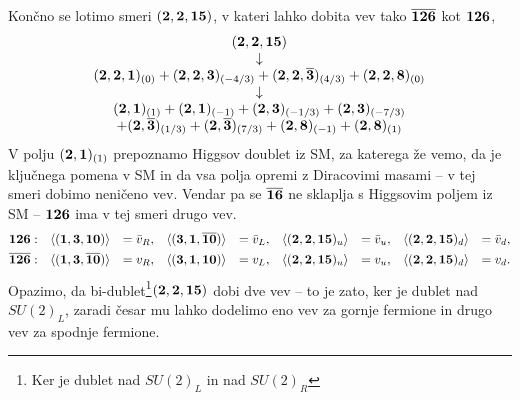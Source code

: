 Končno se lotimo smeri $(\mathbf{2}, \mathbf{2}, \mathbf{15})$, v kateri lahko dobita vev tako $\overline{\mathbf{126}}$ kot $\mathbf{126}$,
\begin{align}
	\begin{array}{c}
		(\mathbf{2}, \mathbf{2}, \mathbf{15}) \\
		\downarrow \\
		(\mathbf{2}, \mathbf{2}, \mathbf{1})_{(0)} + (\mathbf{2}, \mathbf{2}, \mathbf{3})_{(-4/3)} + (\mathbf{2}, \mathbf{2}, \overline{\mathbf{3}})_{(4/3)}
			+ (\mathbf{2}, \mathbf{2}, \mathbf{8})_{(0)} \\
		\downarrow \\
		(\mathbf{2}, \mathbf{1})_{(1)} + (\mathbf{2}, \mathbf{1})_{(-1)} + (\mathbf{2}, \mathbf{3})_{(-1/3)} + (\mathbf{2}, \mathbf{3})_{(-7/3)} \\
		+ (\mathbf{2}, \overline{\mathbf{3}})_{(1/3)} + (\mathbf{2}, \overline{\mathbf{3}})_{(7/3)} + (\mathbf{2}, \mathbf{8})_{(-1)} + (\mathbf{2}, \mathbf{8})_{(1)}
	\end{array}
\end{align}
V polju $(\mathbf{2}, \mathbf{1})_{(1)}$ prepoznamo Higgsov doublet iz SM, za katerega že vemo, da je ključnega pomena
v SM in da vsa polja opremi z Diracovimi masami -- v tej smeri dobimo neničeno vev. Vendar pa se
$\overline{\mathbf{16}}$ ne sklaplja s Higgsovim poljem iz SM -- $\mathbf{126}$ ima v tej smeri drugo vev.
\begin{alignat}{7}
	\mathbf{126}:&\quad \langle(\mathbf{1}, \mathbf{3}, \mathbf{10})\rangle &= \bar{v}_R, &\quad \langle(\mathbf{3}, \mathbf{1}, \overline{\mathbf{10}})\rangle
		&=\bar{v}_L, &\quad \langle(\mathbf{2}, \mathbf{2}, \mathbf{15})_u\rangle &= \bar{v}_u, &\quad
		\langle(\mathbf{2}, \mathbf{2}, \mathbf{15})_d\rangle &= \bar{v}_d, \notag \\
	\overline{\mathbf{126}}:&\quad \langle(\mathbf{1}, \mathbf{3}, \overline{\mathbf{10}})\rangle &= v_R, &\quad \langle(\mathbf{3}, \mathbf{1}, \mathbf{10})\rangle &=
	v_L, &\quad \langle(\mathbf{2}, \mathbf{2}, \mathbf{15})_u\rangle &= v_u, &\quad \langle(\mathbf{2}, \mathbf{2}, \mathbf{15})_d\rangle &=
	v_d.
\end{alignat}
Opazimo, da bi-dublet\footnote{Ker je dublet nad $SU(2)_L$ in nad $SU(2)_R$}$(\mathbf{2}, \mathbf{2}, \mathbf{15})$ dobi
dve vev -- to je zato, ker je dublet nad $SU(2)_L$, zaradi česar mu lahko dodelimo eno vev za gornje
fermione in drugo vev za spodnje fermione.

